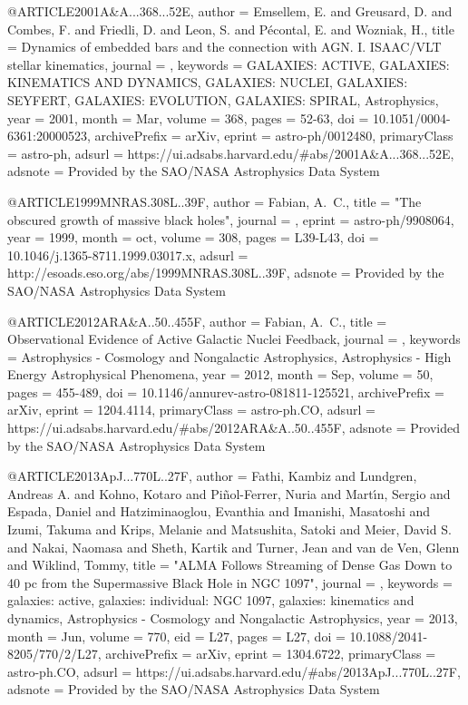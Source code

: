 \documentclass[longauth]{aa}
\begin{document}
@ARTICLE{2001A&A...368...52E,
       author = {{Emsellem}, E. and {Greusard}, D. and {Combes}, F. and {Friedli}, D. and {Leon}, S. and {P{\'e}contal}, E. and {Wozniak}, H.},
        title = {Dynamics of embedded bars and the connection with AGN. I. ISAAC/VLT stellar kinematics},
      journal = {\aap},
     keywords = {GALAXIES: ACTIVE, GALAXIES: KINEMATICS AND DYNAMICS, GALAXIES: NUCLEI, GALAXIES: SEYFERT, GALAXIES: EVOLUTION, GALAXIES: SPIRAL, Astrophysics},
         year = 2001,
        month = Mar,
       volume = {368},
        pages = {52-63},
          doi = {10.1051/0004-6361:20000523},
archivePrefix = {arXiv},
       eprint = {astro-ph/0012480},
 primaryClass = {astro-ph},
       adsurl = {https://ui.adsabs.harvard.edu/#abs/2001A&A...368...52E},
      adsnote = {Provided by the SAO/NASA Astrophysics Data System}
}

@ARTICLE{1999MNRAS.308L..39F,
   author = {{Fabian}, A.~C.},
    title = "{The obscured growth of massive black holes}",
  journal = {\mnras},
   eprint = {astro-ph/9908064},
     year = 1999,
    month = oct,
   volume = 308,
    pages = {L39-L43},
      doi = {10.1046/j.1365-8711.1999.03017.x},
   adsurl = {http://esoads.eso.org/abs/1999MNRAS.308L..39F},
  adsnote = {Provided by the SAO/NASA Astrophysics Data System}
}

@ARTICLE{2012ARA&A..50..455F,
       author = {{Fabian}, A.~C.},
        title = {Observational Evidence of Active Galactic Nuclei Feedback},
      journal = {\araa},
     keywords = {Astrophysics - Cosmology and Nongalactic Astrophysics, Astrophysics -
        High Energy Astrophysical Phenomena},
         year = 2012,
        month = Sep,
       volume = {50},
        pages = {455-489},
          doi = {10.1146/annurev-astro-081811-125521},
archivePrefix = {arXiv},
       eprint = {1204.4114},
 primaryClass = {astro-ph.CO},
       adsurl = {https://ui.adsabs.harvard.edu/#abs/2012ARA&A..50..455F},
      adsnote = {Provided by the SAO/NASA Astrophysics Data System}
}

@ARTICLE{2013ApJ...770L..27F,
       author = {{Fathi}, Kambiz and {Lundgren}, Andreas A. and {Kohno}, Kotaro and {Pi{\~n}ol-Ferrer}, Nuria and {Mart{\'\i}n}, Sergio and {Espada}, Daniel and {Hatziminaoglou}, Evanthia and {Imanishi}, Masatoshi and {Izumi}, Takuma and {Krips}, Melanie and {Matsushita}, Satoki and {Meier}, David S. and {Nakai}, Naomasa and {Sheth}, Kartik and {Turner}, Jean and {van de Ven}, Glenn and {Wiklind}, Tommy},
        title = "{ALMA Follows Streaming of Dense Gas Down to 40 pc from the Supermassive
        Black Hole in NGC 1097}",
      journal = {\apj},
     keywords = {galaxies: active, galaxies: individual: NGC 1097, galaxies: kinematics and dynamics, Astrophysics - Cosmology and Nongalactic Astrophysics},
         year = 2013,
        month = Jun,
       volume = {770},
          eid = {L27},
        pages = {L27},
          doi = {10.1088/2041-8205/770/2/L27},
archivePrefix = {arXiv},
       eprint = {1304.6722},
 primaryClass = {astro-ph.CO},
       adsurl = {https://ui.adsabs.harvard.edu/#abs/2013ApJ...770L..27F},
      adsnote = {Provided by the SAO/NASA Astrophysics Data System}
}
\end{document}
